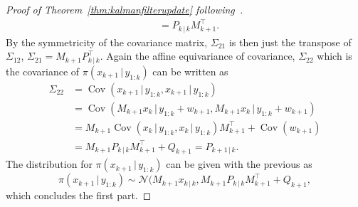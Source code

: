 \begin{proof}[Proof of Theorem~\ref{thm:kalmanfilterupdate} following~\cite{sarkka}]
\begin{align*}
                    &=  P_{k \, \vert \, k}M_{k+1}^{\top}.
    \end{align*}
    By the symmetricity of the covariance matrix, $\Sigma_{21}$ is then just the transpose of $\Sigma_{12}$, $\Sigma_{21}= M_{k+1}P_{k \, \vert \, k}^{\top}$.
    Again the affine equivariance of covariance, $\Sigma_{22}$ which is the covariance of $\pi(x_{k+1} \, \vert \, y_{1:k})$ can be written as
    \begin{align*}
        \Sigma_{22} &= \operatorname{Cov}(x_{k+1} \, \vert \, y_{1:k}, x_{k+1} \, \vert \, y_{1:k})\\
                    &= \operatorname{Cov}(M_{k+1} x_k \, \vert \, y_{1:k} + w_{k+1}, M_{k+1} x_k \, \vert \, y_{1:k} + w_{k+1})\\
                    &= M_{k+1} \operatorname{Cov}(x_k \, \vert \, y_{1:k}, x_k \, \vert \, y_{1:k}) M_{k+1}^{\top} + \operatorname{Cov}(w_{k+1})\\
                    &= M_{k+1} P_{k \, \vert \, k} M_{k+1}^{\top} + Q_{k+1} = P_{k+1 \, \vert \, k}.
    \end{align*}
    The distribution for $\pi(x_{k+1} \, \vert \, y_{1:k})$ can be given with the previous as
    \begin{equation*}
        \pi(x_{k+1} \, \vert \, y_{1:k}) \sim \mathcal{N}(M_{k+1}x_{k\,\vert\,k}, M_{k+1}P_{k\,\vert\,k}M_{k+1}^{\top} + Q_{k+1},
    \end{equation*}
    which concludes the first part.


\end{proof}
